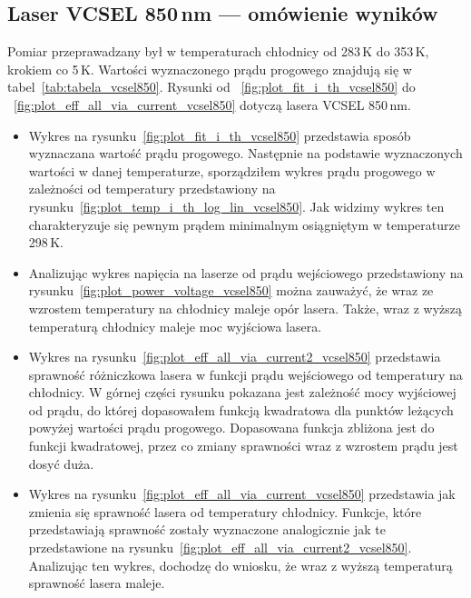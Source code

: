 \newpage
\subsection{Laser VCSEL 850\,nm --- omówienie wyników}
Pomiar przeprawadzany był w temperaturach chłodnicy od 283\,K do 353\,K, krokiem co 5\,K. Wartości wyznaczonego prądu progowego
znajdują się w tabel~\ref{tab:tabela_vcsel850}. Rysunki od ~\ref{fig:plot_fit_i_th_vcsel850} do ~\ref{fig:plot_eff_all_via_current_vcsel850} dotyczą lasera
VCSEL 850\,nm.
\begin{itemize}
\item Wykres na rysunku~\ref{fig:plot_fit_i_th_vcsel850} przedstawia sposób wyznaczana wartość prądu progowego. Następnie na podstawie
wyznaczonych wartości w danej temperaturze, sporządziłem wykres prądu progowego w zależności od temperatury
przedstawiony na rysunku~\ref{fig:plot_temp_i_th_log_lin_vcsel850}. Jak widzimy wykres ten charakteryzuje się pewnym prądem
minimalnym osiągniętym w temperaturze 298\,K.
\item Analizując wykres napięcia na laserze od prądu wejściowego przedstawiony na rysunku~\ref{fig:plot_power_voltage_vcsel850}
można zauważyć, że wraz ze wzrostem temperatury na chłodnicy
maleje opór lasera. Także, wraz z wyższą temperaturą chłodnicy maleje moc wyjściowa lasera.
\item Wykres na rysunku~\ref{fig:plot_eff_all_via_current2_vcsel850} przedstawia sprawność różniczkowa lasera w funkcji prądu wejściowego
od temperatury na chłodnicy. W górnej części rysunku pokazana jest zależność mocy wyjściowej od prądu, do której dopasowałem
funkcją kwadratowa dla punktów leżących powyżej wartości prądu progowego. Dopasowana funkcja zbliżona jest do funkcji kwadratowej,
przez co zmiany sprawności wraz z wzrostem prądu jest dosyć duża.
\item Wykres na rysunku~\ref{fig:plot_eff_all_via_current_vcsel850} przedstawia jak zmienia się sprawność lasera od temperatury chłodnicy.
Funkcje, które przedstawiają sprawność zostały wyznaczone analogicznie jak te przedstawione na rysunku~\ref{fig:plot_eff_all_via_current2_vcsel850}.
Analizując ten wykres, dochodzę do wniosku, że wraz z wyższą temperaturą sprawność lasera maleje.
\end{itemize}
